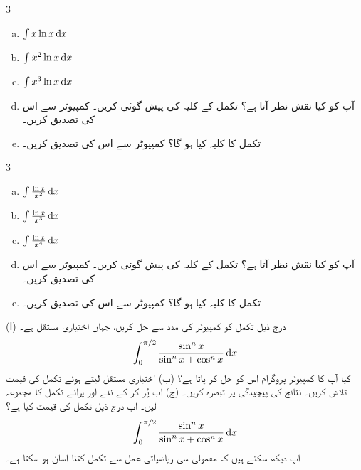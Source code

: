 \begin{multicols}{3}
\begin{enumerate}[a.]
\item
$\int x\ln x\dif x$
\item
$\int x^2\ln x\dif x$
\item
$\int x^3\ln x\dif x$
\item
آپ کو کیا نقش نظر آتا ہے؟ تکمل  کے کلیہ کی پیش گوئی کریں۔ کمپیوٹر سے اس کی تصدیق کریں۔
\item
تکمل  کا کلیہ کیا ہو گا؟ کمپیوٹر سے اس کی تصدیق کریں۔
\end{enumerate}
\end{multicols}
\begin{multicols}{3}
\begin{enumerate}[a.]
\item
$\int \frac{\ln x}{x^2}\dif x$
\item
$\int \frac{\ln x}{x^3}\dif x$
\item
$\int \frac{\ln x}{x^4}\dif x$
\item
آپ کو کیا نقش نظر آتا ہے؟ تکمل  کے کلیہ کی پیش گوئی کریں۔ کمپیوٹر سے اس کی تصدیق کریں۔
\item
تکمل  کا کلیہ کیا ہو گا؟ کمپیوٹر سے اس کی تصدیق کریں۔
\end{enumerate}
\end{multicols}
(ا) درج ذیل تکمل کو کمپیوٹر کی مدد سے حل کریں، جہاں  اختیاری مستقل ہے۔
\begin{align*}
\int_0^{\pi/2}\frac{\sin^n x}{\sin^n x+\cos^n x}\dif x
\end{align*}
کیا آپ کا کمپیوٹر پروگرام اس کو حل کر پاتا ہے؟   (ب) اختیاری مستقل  لیتے ہوئے تکمل کی قیمت تلاش کریں۔ نتائج کی پیچیدگی پر تبصرہ کریں۔ (ج) اب  پُر کر کے نئے اور پرانے تکمل کا مجموعہ لیں۔ اب درج ذیل تکمل کی  قیمت کیا ہے؟
\begin{align*}
\int_0^{\pi/2}\frac{\sin^nx}{\sin^nx+\cos^nx}\dif x
\end{align*}
آپ دیکھ سکتے ہیں کہ معمولی سی ریاضیاتی عمل سے تکمل کتنا آسان ہو سکتا ہے۔




